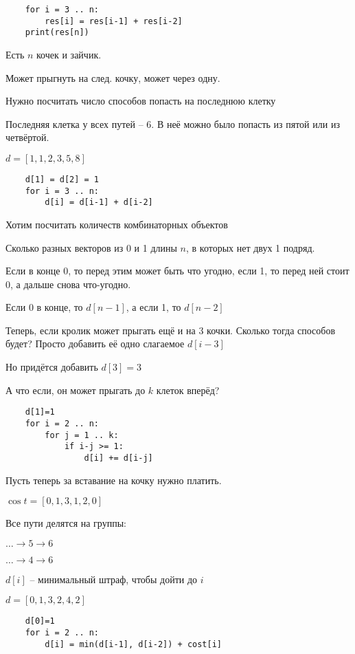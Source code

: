 \documentclass{book}
\theoremstyle{definition}
\begin{document}
 \begin{verbatim}
    for i = 3 .. n:
        res[i] = res[i-1] + res[i-2]
    print(res[n])
\end{verbatim}

\begin{problem}
    Есть $n$ кочек и зайчик. 

    Может прыгнуть на след. кочку, может через одну. 

    Нужно посчитать число способов попасть на последнюю клетку
\end{problem}

Последняя клетка у всех путей -- 6. В неё можно было попасть из пятой или из четвёртой. 

$d = [1, 1, 2, 3, 5, 8]$

 \begin{verbatim}
    d[1] = d[2] = 1
    for i = 3 .. n:
        d[i] = d[i-1] + d[i-2]
\end{verbatim}

Хотим посчитать количеств комбинаторных объектов

Сколько разных векторов из 0 и 1 длины $n$, в которых нет двух 1 подряд.

Если в конце 0, то перед этим может быть что угодно, если 1, то перед ней стоит 0, а дальше снова что-угодно.

Если 0 в конце, то $d[n-1]$, а если 1, то  $d[n-2]$

Теперь, если кролик может прыгать ещё и на 3 кочки. Сколько тогда способов будет? Просто добавить её одно слагаемое $d[i-3]$

Но придётся добавить  $d[3]=3$

А что если, он может прыгать до  $k$ клеток вперёд?

 \begin{verbatim}
    d[1]=1
    for i = 2 .. n:
        for j = 1 .. k:
            if i-j >= 1:
                d[i] += d[i-j]
\end{verbatim}  

Пусть теперь за вставание на кочку нужно платить.

$\cos t = [0,1,3, 1, 2, 0]$

Все пути делятся на группы:

$\ldots \to 5\to 6$

$\ldots\to 4\to 6$

$d[i]$ -- минимальный штраф, чтобы дойти до $i$

$d = [0,1,3,2,4,2] $

\begin{verbatim}
    d[0]=1
    for i = 2 .. n:
        d[i] = min(d[i-1], d[i-2]) + cost[i]
\end{verbatim}
\end{document}
